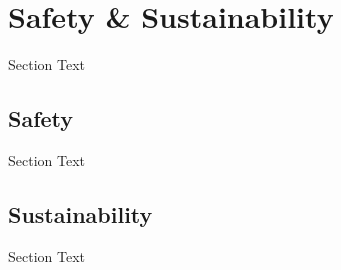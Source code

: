 \setcounter{section}{4}
\section{Safety \& Sustainability}
\bigskip
Section Text

\break
\subsection{Safety}
\bigskip
Section Text


\break
\subsection{Sustainability}
\bigskip
Section Text